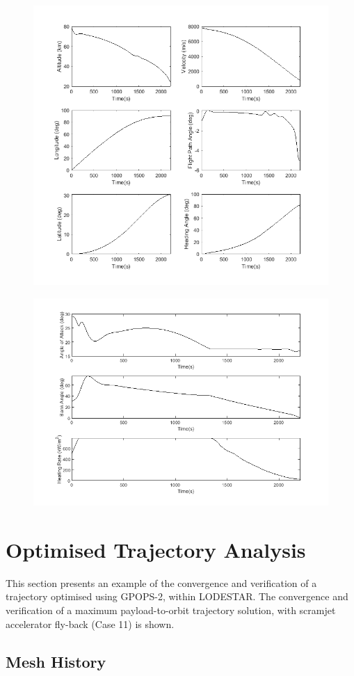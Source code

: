 \begin{figure}[H]
\centering
\includegraphics[width=0.7\linewidth]{figures/A1_uncertainty-analysis/SpaceShuttleq1}
\caption{}
\label{fig:SpaceShuttleq1}
\end{figure}
\begin{figure}[H]
\centering
\includegraphics[width=0.7\linewidth]{figures/A1_uncertainty-analysis/SpaceShuttleq2}
\caption{}
\label{fig:SpaceShuttleq2}
\end{figure}



\section{Optimised Trajectory Analysis}

This section presents an example of the convergence and verification of a trajectory optimised using GPOPS-2, within LODESTAR. The convergence and verification of a maximum payload-to-orbit trajectory solution, with scramjet accelerator fly-back (Case 11) is shown. 

\subsection{Mesh History}

